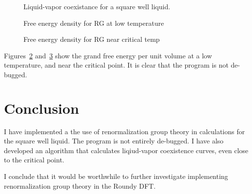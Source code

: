 \documentclass[letterpaper,twocolumn,amsmath,amssymb,prb]{revtex4-1}
\newcommand{\1}{\ensuremath{\textbf{r}_1}}
\newcommand{\2}{\ensuremath{\textbf{r}_2}}
\newcommand{\3}{\ensuremath{\textbf{r}_3}}
\newcommand{\4}{\ensuremath{\textbf{r}_4}}
\begin{document}
\begin{figure}
  \begin{center}
  \end{center}
  \caption{Liquid-vapor coexistance for a square well liquid.}
  \label{fig:coexistance_SW}
\end{figure}

\begin{figure}
  \begin{center}
  \end{center}
  \caption{Free energy density for RG at low temperature}
  \label{fig:phi-RG-lowT}
\end{figure}

\begin{figure}
  \begin{center}
  \end{center}
  \caption{Free energy density for RG near critical temp}
  \label{fig:phi-RG-highT}
\end{figure}

Figures~\ref{fig:phi-RG-lowT} and~\ref{fig:phi-RG-highT} show the
grand free energy per unit volume at a low temperature, and near the
critical point. It is clear that the program is not de-bugged.


\section{Conclusion}\label{sec:conclusion}

I have implemented a the use of renormalization group theory in
calculations for the square well liquid. The program is not entirely
de-bugged. I have also developed an algorithm that calculates
liqiud-vapor coexistence curves, even close to the critical point.

I conclude that it would be worthwhile to further investigate implementing renormalization group theory in the Roundy DFT.



\end{document}
